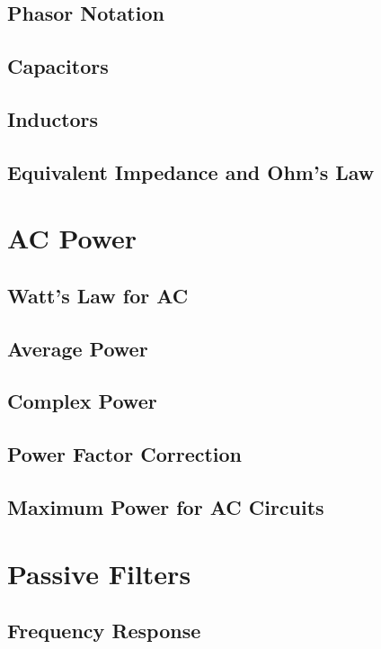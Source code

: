 \documentclass[a4paper,11pt]{book}
\begin{document}
\section{Phasor Notation}

\section{Capacitors}

\section{Inductors}

\section{Equivalent Impedance and Ohm's Law}

\chapter{AC Power}
\section{Watt's Law for AC}

\section{Average Power}

\section{Complex Power}

\section{Power Factor Correction}

\section{Maximum Power for AC Circuits}

\chapter{Passive Filters}
\section{Frequency Response}

\end{document}
